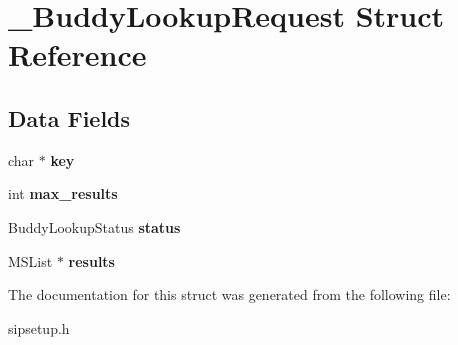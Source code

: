 \section{\+\_\+\+Buddy\+Lookup\+Request Struct Reference}
\label{struct__BuddyLookupRequest}
\subsection*{Data Fields}
\begin{DoxyCompactItemize}
\item 
\mbox{\label{struct__BuddyLookupRequest_a4c0d2480d96824224a694b293a36ca08}} 
char $\ast$ {\bfseries key}
\item 
\mbox{\label{struct__BuddyLookupRequest_aa60fe714a0f2ac8e4e4009cbd34c94fa}} 
int {\bfseries max\+\_\+results}
\item 
\mbox{\label{struct__BuddyLookupRequest_a48f38a208869f4a8bcd4d3d369ba0918}} 
Buddy\+Lookup\+Status {\bfseries status}
\item 
\mbox{\label{struct__BuddyLookupRequest_a623b37222a76db0073f5059abdd0ca8a}} 
M\+S\+List $\ast$ {\bfseries results}
\end{DoxyCompactItemize}


The documentation for this struct was generated from the following file\+:\begin{DoxyCompactItemize}
\item 
sipsetup.\+h\end{DoxyCompactItemize}
